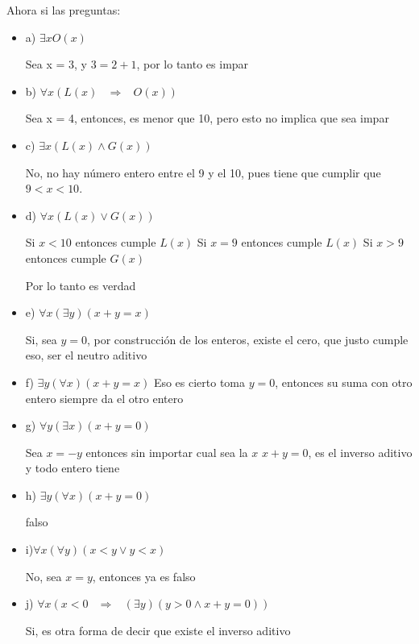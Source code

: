 \documentclass[12pt, fleqn]{article}                            %
\DeclareMathOperator \Space     {\quad}                         %
\DeclareMathOperator \MiniSpace {\;}                            %
\theoremstyle{break}                                            %
\newcommand \lInfire {\MiniSpace \Rightarrow \MiniSpace}        %
\newcommand \lAnd    {\land}                                    %
\newcommand \lOr     {\lor}                                     %
\begin{document}
    Ahora si las preguntas:
    \begin{itemize}
        \item a) $\exists x O(x)$

            Sea x = 3, y $3 = 2 + 1$, por lo tanto es impar

        \item b) $\forall x(L(x) \lInfire O(x))$

            Sea x = 4, entonces, es menor que 10, pero esto no implica
            que sea impar

        \item c) $\exists x(L(x) \lAnd G(x))$

            No, no hay número entero entre el 9 y el 10, pues tiene que cumplir
            que $9 < x < 10$. 

        \item d) $\forall x(L(x) \lOr G(x))$

            Si $x < 10$ entonces cumple $L(x)$
            Si $x = 9$ entonces cumple $L(x)$
            Si $x > 9$ entonces cumple $G(x)$

            Por lo tanto es verdad

        \item e) $\forall x( \exists y)(x + y = x)$

            Si, sea $y = 0$, por construcción de los enteros, existe
            el cero, que justo cumple eso, ser el neutro aditivo

        \item f) $\exists y( \forall x)(x + y = x)$
            Eso es cierto toma $y = 0$, entonces su suma con otro entero
            siempre da el otro entero
            
        \item g) $\forall y( \exists x)(x + y = 0)$

            Sea $x = -y$ entonces sin importar cual sea la $x$
            $x + y = 0$, es el inverso aditivo y todo entero tiene

        \item h) $\exists y( \forall x)(x + y = 0)$

            falso

        \item i)$\forall x( \forall y)(x < y \lOr y < x)$

            No, sea $x = y$, entonces ya es falso

        \item j) $\forall x(x < 0 \lInfire (\exists y)(y > 0 \lAnd x + y = 0))$

            Si, es otra forma de decir que existe el inverso aditivo

    \end{itemize}
\end{document}
